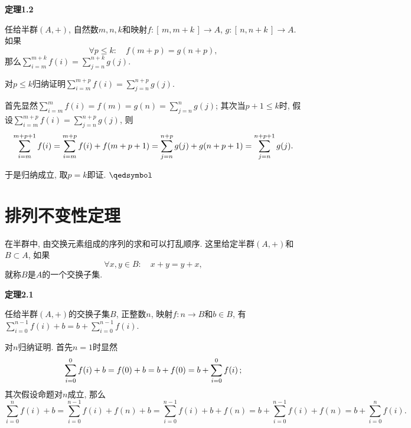 \documentclass[UTF8]{ctexart}
\begin{document}
\vspace{10pt}

\hypertarget{sec:定理1.2}{}
\noindent\textbf{定理1.2}

任给半群$(A,+)$, 自然数$m,n,k$和映射$f:[\,m,m+k\,]\to A$,
$g:[\,n,n+k\,]\to A$. 如果
\[
    \forall p\leqslant k:\quad f(m+p)=g(n+p),
\]
那么$\displaystyle\sum_{i=m}^{m+k}f(i)=\sum_{j=n}^{n+k}g(j)$.

\vspace{3pt}

对$p\leqslant k$归纳证明$\displaystyle\sum_{i=m}^{m+p}f(i)=\sum_{j=n}^{n+p}g(j)$.

首先显然$\displaystyle\sum_{i=m}^{m}f(i)=f(m)=g(n)=\sum_{j=n}^{n}g(j)$;
其次当$p+1\leqslant k$时,
假设$\displaystyle\sum_{i=m}^{m+p}f(i)=\sum_{j=n}^{n+p}g(j)$, 则
\vspace{3pt}
\[
    \sum_{i=m}^{m+p+1}f(i)=\sum_{i=m}^{m+p}f(i)+f(m+p+1)=
    \sum_{j=n}^{n+p}g(j)+g(n+p+1)=\sum_{j=n}^{n+p+1}g(j).\\[3pt]
\]

于是归纳成立, 取$p=k$即证. \hfill $\qedsymbol$





\newpage

\section{排列不变性定理}

在半群中, 由交换元素组成的序列的求和可以打乱顺序.
这里给定半群$(A,+)$和$B\subset A$, 如果
\[
    \forall x,y\in B:\quad x+y=y+x,
\]
就称$B$是$A$的一个交换子集.

\vspace{10pt}

\hypertarget{sec:定理2.1}{}
\noindent\textbf{定理2.1}

\vspace{-3pt}
任给半群$(A,+)$的交换子集$B$, 正整数$n$, 映射$f:n\to B$和$b\in B$,
有$\displaystyle\sum_{i=0}^{n-1}f(i)+b=b+\sum_{i=0}^{n-1}f(i)$.


对$n$归纳证明. 首先$n=1$时显然
\vspace{3pt}
\[
    \sum_{i=0}^0f(i)+b=f(0)+b=b+f(0)=b+\sum_{i=0}^0f(i)\,;\\[3pt]
\]
其次假设命题对$n$成立, 那么
\vspace{3pt}
\begin{equation*}
    \sum_{i=0}^nf(i)+b=\sum_{i=0}^{n-1}f(i)+f(n)+b=
    \sum_{i=0}^{n-1}f(i)+b+f(n)=b+\sum_{i=0}^{n-1}f(i)+f(n)=
    b+\sum_{i=0}^nf(i).
\tag*{\qedsymbol}\end{equation*}
\end{document}
